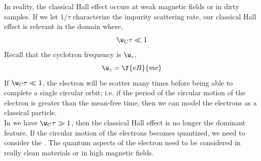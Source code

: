 \documentclass{article}
\begin{document}
\begin{center}
\end{center}

In reality, the classical Hall effect occurs at weak magnetic fields or in dirty samples.
If we let $1/\tau$ characterize the impurity scattering rate, our classical Hall effect is relevant in the domain where,
\[ \w_{C} \tau \ll 1 \]
Recall that the cyclotron frequency is $\w_c$,
\[ \w_c = \f{eB}{mc} \]
If $\w_{C} \tau \ll 1$, the electron will be scatter many times before being able to complete a single circular orbit; i.e. if the period of the circular motion of the electron is greater than the mean-free time, then we can model the electrons as a classical particle.\\

In we have $\w_{C} \tau \gg 1$, then the classical Hall effect is no longer the dominant feature. If the circular motion of the electrons becomes quantized, we need to consider the . The quantum aspects of the electron need to be considered in really clean materials or in high magnetic fields.\\
\end{document}
